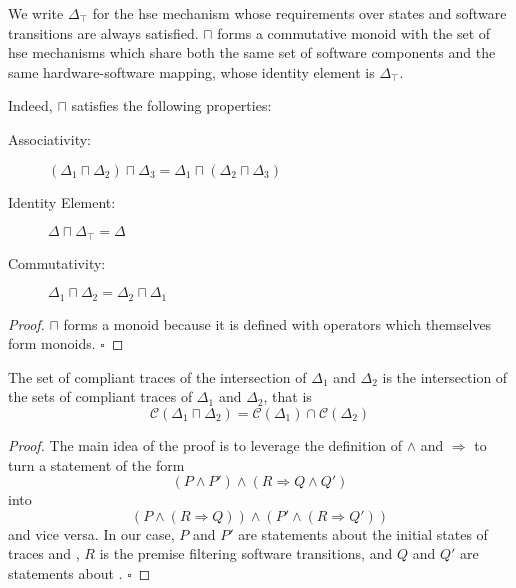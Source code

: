 \begin{lemma}
  We write $\Delta_\top$ for the \ac{hse} mechanism whose requirements over
  states and software transitions are always satisfied.
  \( \sqcap \) forms a commutative monoid with the set of \ac{hse} mechanisms
  which share both the same set of software components and the same
  hardware-software mapping, whose identity element is \( \Delta_\top \).

  Indeed, \( \sqcap \) satisfies the following properties:

  \begin{description}
  \item [Associativity:]
    \( (\Delta_1 \sqcap \Delta_2) \sqcap \Delta_3 = \Delta_1 \sqcap (\Delta_2
    \sqcap \Delta_3) \)
  \item [Identity Element:] \( \Delta \sqcap \Delta_\top = \Delta \)
  \item [Commutativity:]
    \( \Delta_1 \sqcap \Delta_2 = \Delta_2 \sqcap \Delta_1 \)
  \end{description}

  \begin{proof}
    \( \sqcap \) forms a monoid because it is defined with operators which
    themselves form monoids.
    \hfill \( \square \)
  \end{proof}
\end{lemma}

\begin{lemma}
  \label{lemma:speccert:compinter}
  The set of compliant traces of the intersection of $\Delta_1$ and $\Delta_2$
  is the intersection of the sets of compliant traces of $\Delta_1$ and
  $\Delta_2$, that is
  \[
    \mathcal{C}(\Delta_1 \sqcap \Delta_2) = \mathcal{C}(\Delta_1) \cap
    \mathcal{C}(\Delta_2)
  \]

  \begin{proof}
    The main idea of the proof is to leverage the definition of $\wedge$ and
    $\Rightarrow$ to turn a statement of the form
    \[
      (P \wedge P') \wedge (R \Rightarrow Q \wedge Q')
    \]
    into
    \[
      (P \wedge (R \Rightarrow Q)) \wedge (P' \wedge (R \Rightarrow Q'))
    \]
    and vice versa.
    In our case, $P$ and $P'$ are statements about the initial states of traces
    and , $R$ is the premise filtering software transitions,
    and $Q$ and $Q'$ are statements about .
    \hfill \( \square \)
  \end{proof}
\end{lemma}

